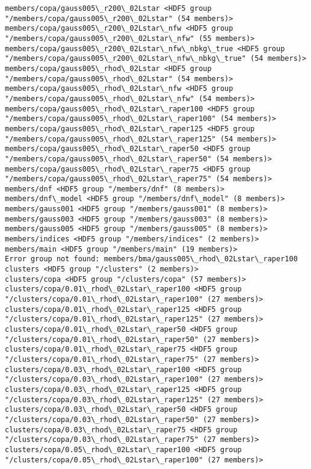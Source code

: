 \documentclass[11pt]{article}
\begin{document}
\begin{Verbatim}[commandchars=\\\{\}]
members/copa/gauss005\_r200\_02Lstar <HDF5 group "/members/copa/gauss005\_r200\_02Lstar" (54 members)>
members/copa/gauss005\_r200\_02Lstar\_nfw <HDF5 group "/members/copa/gauss005\_r200\_02Lstar\_nfw" (55 members)>
members/copa/gauss005\_r200\_02Lstar\_nfw\_nbkg\_true <HDF5 group "/members/copa/gauss005\_r200\_02Lstar\_nfw\_nbkg\_true" (54 members)>
members/copa/gauss005\_rhod\_02Lstar <HDF5 group "/members/copa/gauss005\_rhod\_02Lstar" (54 members)>
members/copa/gauss005\_rhod\_02Lstar\_nfw <HDF5 group "/members/copa/gauss005\_rhod\_02Lstar\_nfw" (54 members)>
members/copa/gauss005\_rhod\_02Lstar\_raper100 <HDF5 group "/members/copa/gauss005\_rhod\_02Lstar\_raper100" (54 members)>
members/copa/gauss005\_rhod\_02Lstar\_raper125 <HDF5 group "/members/copa/gauss005\_rhod\_02Lstar\_raper125" (54 members)>
members/copa/gauss005\_rhod\_02Lstar\_raper50 <HDF5 group "/members/copa/gauss005\_rhod\_02Lstar\_raper50" (54 members)>
members/copa/gauss005\_rhod\_02Lstar\_raper75 <HDF5 group "/members/copa/gauss005\_rhod\_02Lstar\_raper75" (54 members)>
members/dnf <HDF5 group "/members/dnf" (8 members)>
members/dnf\_model <HDF5 group "/members/dnf\_model" (8 members)>
members/gauss001 <HDF5 group "/members/gauss001" (8 members)>
members/gauss003 <HDF5 group "/members/gauss003" (8 members)>
members/gauss005 <HDF5 group "/members/gauss005" (8 members)>
members/indices <HDF5 group "/members/indices" (2 members)>
members/main <HDF5 group "/members/main" (19 members)>
Error group not found: members/bma/gauss005\_rhod\_02Lstar\_raper100
clusters <HDF5 group "/clusters" (2 members)>
clusters/copa <HDF5 group "/clusters/copa" (57 members)>
clusters/copa/0.01\_rhod\_02Lstar\_raper100 <HDF5 group "/clusters/copa/0.01\_rhod\_02Lstar\_raper100" (27 members)>
clusters/copa/0.01\_rhod\_02Lstar\_raper125 <HDF5 group "/clusters/copa/0.01\_rhod\_02Lstar\_raper125" (27 members)>
clusters/copa/0.01\_rhod\_02Lstar\_raper50 <HDF5 group "/clusters/copa/0.01\_rhod\_02Lstar\_raper50" (27 members)>
clusters/copa/0.01\_rhod\_02Lstar\_raper75 <HDF5 group "/clusters/copa/0.01\_rhod\_02Lstar\_raper75" (27 members)>
clusters/copa/0.03\_rhod\_02Lstar\_raper100 <HDF5 group "/clusters/copa/0.03\_rhod\_02Lstar\_raper100" (27 members)>
clusters/copa/0.03\_rhod\_02Lstar\_raper125 <HDF5 group "/clusters/copa/0.03\_rhod\_02Lstar\_raper125" (27 members)>
clusters/copa/0.03\_rhod\_02Lstar\_raper50 <HDF5 group "/clusters/copa/0.03\_rhod\_02Lstar\_raper50" (27 members)>
clusters/copa/0.03\_rhod\_02Lstar\_raper75 <HDF5 group "/clusters/copa/0.03\_rhod\_02Lstar\_raper75" (27 members)>
clusters/copa/0.05\_rhod\_02Lstar\_raper100 <HDF5 group "/clusters/copa/0.05\_rhod\_02Lstar\_raper100" (27 members)>

\end{Verbatim}
\end{document}
